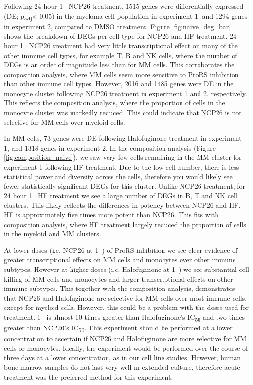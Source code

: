 Following 24-hour 1\si{\micro\Molar} NCP26 treatment, 1515 genes were differentially expressed (DE; p\textsubscript{adj}< 0.05) in the myeloma cell population in experiment 1, and 1294 genes in experiment 2, compared to DMSO treatment.
Figure \ref{fig:naive_deg_bar} shows the breakdown of DEGs per cell type for NCP26 and HF treatment.
24 hour 1\si{\micro\Molar} NCP26 treatment had very little transcriptional effect on many of the other immune cell types, for example T, B and NK cells, where the number of DEGs is an order of magnitude less than for MM cells.
This corroborates the composition analysis, where MM cells seem more sensitive to ProRS inhibition than other immune cell types.
However, 2016 and 1485 genes were DE in the monocyte cluster following NCP26 treatment in experiment 1 and 2, respectively.
This reflects the composition analysis, where the proportion of cells in the monocyte cluster was markedly reduced.
This could indicate that NCP26 is not selective for MM cells over myeloid cells.

In MM cells, 73 genes were DE following Halofuginone treatment in experiment 1, and 1318 genes in experiment 2.
In the composition analysis (Figure \ref{fig:composition_naive}), we saw very few cells remaining in the MM cluster for experiment 1 following HF treatment.
Due to the low cell number, there is less statistical power and diversity across the cells, therefore you would likely see fewer statistically significant DEGs for this cluster.
Unlike NCP26 treatment, for 24 hour 1\si{\micro\Molar} HF treatment we see a large number of DEGs in B, T and NK cell clusters.
This likely reflects the differences in potency between NCP26 and HF\@.
HF is approximately five times more potent than NCP26.
This fits with composition analysis, where HF treatment largely reduced the proportion of cells in the myeloid and MM clusters.

At lower doses (i.e. NCP26 at 1\si{\micro\Molar}) of ProRS inhibition we see clear evidence of greater transcriptional effects on MM cells and monocytes over other immune subtypes.
However at higher doses (i.e. Halofuginone at 1\si{\micro\Molar}) we see substantial cell killing of MM cells and monocytes and larger transcriptional effects on other immune subtypes.
This together with the composition analysis, demonstrates that NCP26 and Halofuginone are selective for MM cells over most immune cells, except for myeloid cells.
However, this could be a problem with the doses used for treatment.
1\si{\micro\Molar} is almost 10 times greater than Halofuginone's IC\textsubscript{50} and two times greater than NCP26's IC\textsubscript{50}.
This experiment should be performed at a lower concentration to ascertain if NCP26 and Halofuginone are more selective for MM cells or monocytes.
Ideally, the experiment would be performed over the course of three days at a lower concentration, as in our cell line studies.
However, human bone marrow samples do not last very well in extended culture, therefore acute treatment was the preferred method for this experiment.

